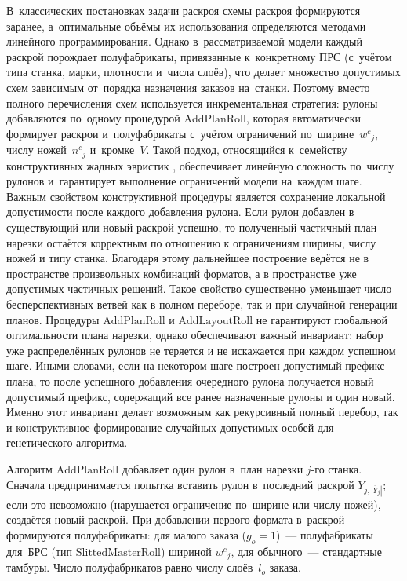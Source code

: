 В~классических постановках задачи раскроя \cite{gilmore1961linear,gilmore1963linear} схемы раскроя формируются заранее, а~оптимальные объёмы их использования определяются методами линейного программирования.
Однако в~рассматриваемой модели каждый раскрой порождает полуфабрикаты, привязанные к~конкретному ПРС (с~учётом типа станка, марки, плотности и~числа слоёв), что делает множество допустимых схем зависимым от~порядка назначения заказов на~станки.
Поэтому вместо полного перечисления схем используется инкрементальная стратегия: рулоны добавляются по~одному процедурой $\mathrm{AddPlanRoll}$, которая автоматически формирует раскрои и~полуфабрикаты с~учётом ограничений по~ширине~${w^c}_j$, числу ножей~${n^c}_j$ и~кромке~$V$.
Такой подход, относящийся к~семейству конструктивных жадных эвристик \cite{cerqueira2021,haessler1991, yagiura2017_cutpack_combinatorial}, обеспечивает линейную сложность по~числу рулонов и~гарантирует выполнение ограничений модели на~каждом шаге.
Важным свойством конструктивной процедуры является сохранение локальной допустимости после каждого добавления рулона. Если рулон добавлен в существующий или новый раскрой успешно, то полученный частичный план нарезки остаётся корректным по отношению к ограничениям ширины, числу ножей и типу станка. Благодаря этому дальнейшее построение ведётся не в пространстве произвольных комбинаций форматов, а в пространстве уже допустимых частичных решений. Такое свойство существенно уменьшает число бесперспективных ветвей как в полном переборе, так и при случайной генерации планов.
Процедуры $\mathrm{AddPlanRoll}$ и $\mathrm{AddLayoutRoll}$ не гарантируют глобальной оптимальности плана нарезки, однако обеспечивают важный инвариант: набор уже распределённых рулонов не теряется и не искажается при каждом успешном шаге. Иными словами, если на некотором шаге построен допустимый префикс плана, то после успешного добавления очередного рулона получается новый допустимый префикс, содержащий все ранее назначенные рулоны и один новый. Именно этот инвариант делает возможным как рекурсивный полный перебор, так и конструктивное формирование случайных допустимых особей для генетического алгоритма.

Алгоритм $\mathrm{AddPlanRoll}$ добавляет один рулон в~план нарезки $j$-го станка.
Сначала предпринимается попытка вставить рулон в~последний раскрой $Y_{j,|\overline{Y}_j|}$; если это невозможно (нарушается ограничение по~ширине или числу ножей), создаётся новый раскрой.
При добавлении первого формата в~раскрой формируются полуфабрикаты: для малого заказа ($g_o=1$)~--- полуфабрикаты для~БРС (тип $\mathrm{SlittedMasterRoll}$) шириной ${w^c}_j$, для обычного~--- стандартные тамбуры.
Число полуфабрикатов равно числу слоёв~$l_o$ заказа.
\begin{center}
\resizebox{\textwidth}{!}{%
    
}
\label{alg:add_plan_roll}
\end{center}


